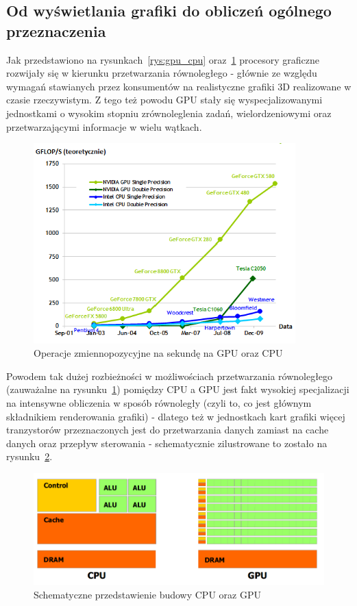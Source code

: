 \subsection{Od wyświetlania grafiki do obliczeń ogólnego przeznaczenia}
Jak przedstawiono na rysunkach~\ref{rys:gpu_cpu} oraz~\ref{rys:gpu_cpu2} procesory graficzne rozwijały się w kierunku przetwarzania równoległego - głównie ze względu wymagań stawianych przez konsumentów na realistyczne grafiki 3D realizowane w czasie rzeczywistym. Z tego też powodu GPU stały się wyspecjalizowanymi jednostkami o wysokim stopniu zrównoleglenia zadań, wielordzeniowymi oraz przetwarzającymi informacje w wielu wątkach. 

\begin{figure}[h]
\centering\includegraphics[width=0.9\textwidth]{figures/03/gpu_cpu2.png}
\caption{Operacje zmiennopozycyjne na sekundę na GPU oraz CPU~\cite{Cuda:PGuide}}\label{rys:gpu_cpu2}
\end{figure}

Powodem tak dużej rozbieżności w możliwościach przetwarzania równoległego (zauważalne na rysunku~\ref{rys:gpu_cpu2}) pomiędzy CPU a GPU jest fakt wysokiej specjalizacji na intensywne obliczenia w sposób równoległy (czyli to, co jest głównym składnikiem renderowania grafiki) - dlatego też w jednostkach kart grafiki więcej tranzystorów przeznaczonych jest do przetwarzania danych zamiast na cache danych oraz przepływ sterowania - schematycznie zilustrowane to zostało na rysunku~\ref{rys:gpu_cpu_trans}.

\begin{figure}[h]
\centering\includegraphics[width=1.0\textwidth]{figures/03/gpu_cpu_trans.png}
\caption{Schematyczne przedstawienie budowy CPU oraz GPU~\cite{Cuda:PGuide}}\label{rys:gpu_cpu_trans}
\end{figure}


